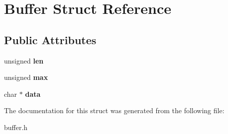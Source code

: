\hypertarget{structBuffer}{\section{Buffer Struct Reference}
\label{structBuffer}
}
\subsection*{Public Attributes}
\begin{DoxyCompactItemize}
\item 
\hypertarget{structBuffer_abdae2012a9f66e215fb4a76da786f5c5}{unsigned {\bfseries len}}\label{structBuffer_abdae2012a9f66e215fb4a76da786f5c5}

\item 
\hypertarget{structBuffer_a89f41b6e95d608f6c65c872eb235148d}{unsigned {\bfseries max}}\label{structBuffer_a89f41b6e95d608f6c65c872eb235148d}

\item 
\hypertarget{structBuffer_aeec1fd4af0ddf6765b0187466d4361b8}{char $\ast$ {\bfseries data}}\label{structBuffer_aeec1fd4af0ddf6765b0187466d4361b8}

\end{DoxyCompactItemize}


The documentation for this struct was generated from the following file\-:\begin{DoxyCompactItemize}
\item 
buffer.\-h\end{DoxyCompactItemize}
